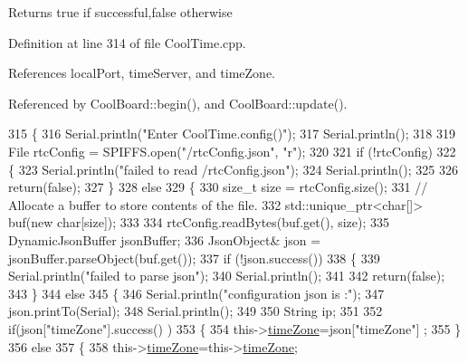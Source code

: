\begin{DoxyReturn}{Returns}
true if successful,false otherwise 
\end{DoxyReturn}


Definition at line 314 of file Cool\+Time.\+cpp.



References local\+Port, time\+Server, and time\+Zone.



Referenced by Cool\+Board\+::begin(), and Cool\+Board\+::update().


\begin{DoxyCode}
315 \{
316     Serial.println(\textcolor{stringliteral}{"Enter CoolTime.config()"});
317     Serial.println();
318 
319     File rtcConfig = SPIFFS.open(\textcolor{stringliteral}{"/rtcConfig.json"}, \textcolor{stringliteral}{"r"});
320 
321     \textcolor{keywordflow}{if} (!rtcConfig) 
322     \{
323         Serial.println(\textcolor{stringliteral}{"failed to read /rtcConfig.json"});
324         Serial.println();
325 
326         \textcolor{keywordflow}{return}(\textcolor{keyword}{false});
327     \}
328     \textcolor{keywordflow}{else}
329     \{
330         \textcolor{keywordtype}{size\_t} size = rtcConfig.size();
331         \textcolor{comment}{// Allocate a buffer to store contents of the file.}
332         std::unique\_ptr<char[]> buf(\textcolor{keyword}{new} \textcolor{keywordtype}{char}[size]);
333 
334         rtcConfig.readBytes(buf.get(), size);
335         DynamicJsonBuffer jsonBuffer;
336         JsonObject& json = jsonBuffer.parseObject(buf.get());
337         \textcolor{keywordflow}{if} (!json.success()) 
338         \{
339             Serial.println(\textcolor{stringliteral}{"failed to parse json"});
340             Serial.println();
341 
342             \textcolor{keywordflow}{return}(\textcolor{keyword}{false});
343         \} 
344         \textcolor{keywordflow}{else}
345         \{   
346             Serial.println(\textcolor{stringliteral}{"configuration json is :"});
347             json.printTo(Serial);
348             Serial.println();
349 
350             String ip;
351             
352             \textcolor{keywordflow}{if}(json[\textcolor{stringliteral}{"timeZone"}].success() )
353             \{
354                 this->\hyperlink{classCoolTime_a1916d98810c2a4e9ba72867e8c1b9a99}{timeZone}=json[\textcolor{stringliteral}{"timeZone"}] ;
355             \}
356             \textcolor{keywordflow}{else}
357             \{
358                 this->\hyperlink{classCoolTime_a1916d98810c2a4e9ba72867e8c1b9a99}{timeZone}=this->\hyperlink{classCoolTime_a1916d98810c2a4e9ba72867e8c1b9a99}{timeZone};          

\end{DoxyCode}
